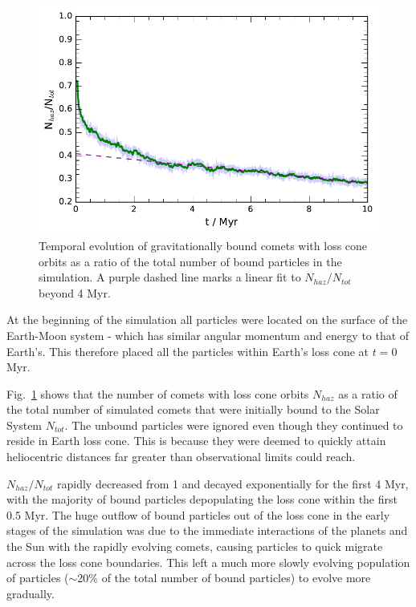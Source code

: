 \begin{figure}[t!]
    \centering
    \includegraphics{figures/exotic_ratio.pdf}
    \caption[Bound particles in the Earth's loss cone]{Temporal evolution of gravitationally bound comets with loss cone orbits as a ratio of the total number of bound particles in the simulation. A purple dashed line marks a linear fit to $N_{haz}/N_{tot}$ beyond 4 Myr.}
    \label{fig:exotic}
\end{figure}

At the beginning of the simulation all particles were located on the surface of the Earth-Moon system - which has similar angular momentum and energy to that of Earth's. This therefore placed all the particles within Earth's loss cone at $t=0$ Myr. 

Fig.~\ref{fig:exotic} shows that the number of comets with loss cone orbits $N_{haz}$ as a ratio of the total number of simulated comets that were initially bound to the Solar System $N_{tot}$. The unbound particles were ignored even though they continued to reside in Earth loss cone. This is because they were deemed to quickly attain heliocentric distances far greater than observational limits could reach.

$N_{haz}/N_{tot}$ rapidly decreased from 1 and decayed exponentially for the first 4 Myr, with the majority of bound particles depopulating the loss cone within the first 0.5 Myr. The huge outflow of bound particles out of the loss cone in the early stages of the simulation was due to the immediate interactions of the planets and the Sun with the rapidly evolving comets, causing particles to quick migrate across the loss cone boundaries. This left a much more slowly evolving population of particles ($\sim$20\% of the total number of bound particles) to evolve more gradually.

